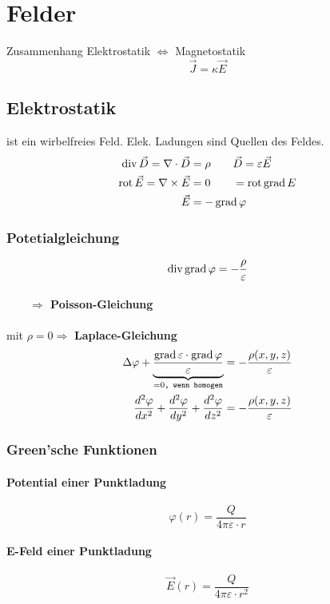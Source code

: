 \section{Felder}
Zusammenhang Elektrostatik $\Leftrightarrow$ Magnetostatik\\
\[ \vec{J} = \kappa \vec{E} \]

\subsection{Elektrostatik}
ist ein wirbelfreies Feld. Elek. Ladungen sind Quellen des Feldes.
\begin{align*}
    \operatorname{div} \vec{D} = \nabla \cdot \vec{D}  & = \rho       \qquad          \vec{D} = \varepsilon \vec{E} \\
    \operatorname{rot} \vec{E} = \nabla \times \vec{E} & = 0          \qquad          = \operatorname{rot} \operatorname{grad} E            \\
    \vec{E}                                & =- \operatorname{grad} \varphi
\end{align*}
\subsubsection{Potetialgleichung}
\[
    \operatorname{div} \operatorname{grad} \varphi = - \dfrac{\rho}{\varepsilon}
\]
\paragraph{$\qquad \Rightarrow$ Poisson-Gleichung}
mit $\rho = 0 \Rightarrow$ \textbf{Laplace-Gleichung}
\begin{align*}
    \Delta \varphi + \underbrace{ \dfrac{\operatorname{grad} \varepsilon \cdot \operatorname{grad} \varphi}{\varepsilon}}_{= 0\texttt{, wenn homogen}}
     & = - \dfrac{\rho (x, y, z)}{\varepsilon} \\
    \frac{d^2 \varphi}{d x^2} + \frac{d^2 \varphi}{d y^2} + \frac{d^2 \varphi}{d z^2}
     & = - \dfrac{\rho (x, y, z)}{\varepsilon}
\end{align*}

\subsubsection{Green'sche Funktionen}
\paragraph*{Potential einer Punktladung}
\[ \varphi (r) = \dfrac{Q}{4 \pi \varepsilon \cdot r}\]

\paragraph*{E-Feld einer Punktladung}
\[ \vec{E}(r) = \dfrac{Q}{4 \pi \varepsilon \cdot r^2}\]

